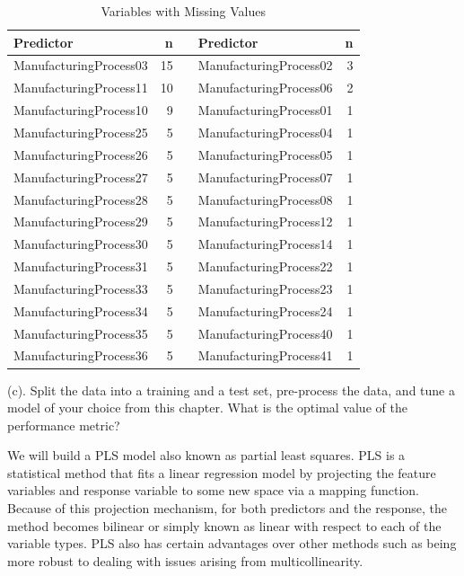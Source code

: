 \documentclass[]{report}
\begin{document}
\begin{table}[H]

\caption{\label{tab:kj-6.3b}Variables with Missing Values}
\centering
\fontsize{8}{10}\selectfont
\begin{tabular}[t]{lr>{\bfseries\raggedright\arraybackslash}p{0.1cm}lr}
\toprule
\textbf{Predictor} & \textbf{n} & \textbf{ } & \textbf{Predictor} & \textbf{n}\\
\midrule
\rowcolor{gray!6}  ManufacturingProcess03 & 15 &  & ManufacturingProcess02 & 3\\
ManufacturingProcess11 & 10 &  & ManufacturingProcess06 & 2\\
\rowcolor{gray!6}  ManufacturingProcess10 & 9 &  & ManufacturingProcess01 & 1\\
ManufacturingProcess25 & 5 &  & ManufacturingProcess04 & 1\\
\rowcolor{gray!6}  ManufacturingProcess26 & 5 &  & ManufacturingProcess05 & 1\\
\addlinespace
ManufacturingProcess27 & 5 &  & ManufacturingProcess07 & 1\\
\rowcolor{gray!6}  ManufacturingProcess28 & 5 &  & ManufacturingProcess08 & 1\\
ManufacturingProcess29 & 5 &  & ManufacturingProcess12 & 1\\
\rowcolor{gray!6}  ManufacturingProcess30 & 5 &  & ManufacturingProcess14 & 1\\
ManufacturingProcess31 & 5 &  & ManufacturingProcess22 & 1\\
\addlinespace
\rowcolor{gray!6}  ManufacturingProcess33 & 5 &  & ManufacturingProcess23 & 1\\
ManufacturingProcess34 & 5 &  & ManufacturingProcess24 & 1\\
\rowcolor{gray!6}  ManufacturingProcess35 & 5 &  & ManufacturingProcess40 & 1\\
ManufacturingProcess36 & 5 &  & ManufacturingProcess41 & 1\\
\bottomrule
\end{tabular}
\end{table}

\begin{subquestion}{(c).} Split the data into a training and a test set, pre-process the data, and tune a model of your choice from this chapter. What is the optimal value of the performance metric? 
\end{subquestion}

We will build a PLS model also known as partial least squares. PLS is a
statistical method that fits a linear regression model by projecting the
feature variables and response variable to some new space via a mapping
function. Because of this projection mechanism, for both predictors and
the response, the method becomes bilinear or simply known as linear with
respect to each of the variable types. PLS also has certain advantages
over other methods such as being more robust to dealing with issues
arising from multicollinearity.
\end{document}
